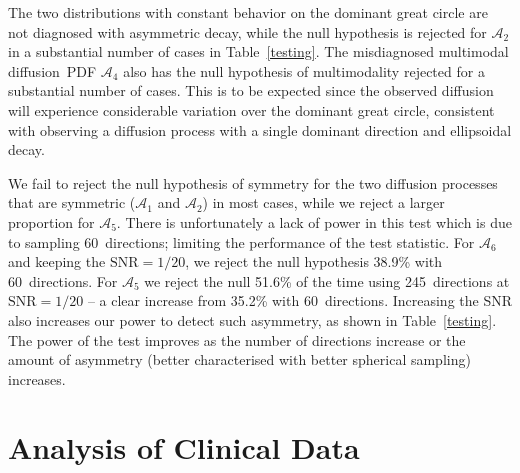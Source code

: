 \documentclass[dvips,aoas,preprint]{imsart}
\numberwithin{equation}{section}
\theoremstyle{plain}
\newcommand{\cA}{\mathcal{A}}
\begin{document}
The two distributions with constant behavior on the dominant great
circle are not diagnosed with asymmetric decay, while the null
hypothesis is rejected for $\cA_2$ in a substantial number of cases in
Table~\ref{testing}.  The misdiagnosed multimodal diffusion~PDF
$\cA_4$ also has the null hypothesis of multimodality rejected for a
substantial number of cases.  This is to be expected since the
observed diffusion will experience considerable variation over the
dominant great circle, consistent with observing a diffusion process
with a single dominant direction and ellipsoidal decay.

We fail to reject the null hypothesis of symmetry for the two
diffusion processes that are symmetric ($\cA_1$ and $\cA_2$) in most
cases, while we reject a larger proportion for $\cA_5$.  There is
unfortunately a lack of power in this test which is due to sampling
60~directions; limiting the performance of the test statistic.  For
$\cA_6$ and keeping the $\text{SNR}=1/20$, we reject the null
hypothesis 38.9\% with 60~directions.  For $\cA_5$ we reject the null
51.6\% of the time using 245~directions at $\text{SNR}=1/20$ -- a
clear increase from 35.2\% with 60~directions.  Increasing the SNR
also increases our power to detect such asymmetry, as shown in
Table~\ref{testing}.  The power of the test improves as the number of
directions increase or the amount of asymmetry (better characterised
with better spherical sampling) increases.

\section{Analysis of Clinical Data}
\end{document}
